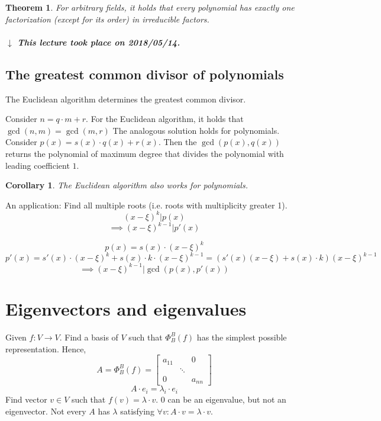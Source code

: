 \documentclass{article}
\newcounter{lecref}[section]
\numberwithin{lecref}{section}
\newtheorem{theorem}[lecref]{Theorem}
\newtheorem{corollary}[lecref]{Corollary}
\newcommand{\dateref}[1]{%
  \begin{mdframed}[backgroundcolor=gray!10,innerbottommargin=0pt,innertopmargin=0pt]
    \paragraph{\textit{$\downarrow$ This lecture took place on #1.}}%
  \end{mdframed}%
}
\begin{document}
\begin{theorem} %
  For arbitrary fields, it holds that
  every polynomial has exactly one factorization (except for its order) in irreducible factors.
\end{theorem}

\dateref{2018/05/14}

\subsection{The greatest common divisor of polynomials}

The Euclidean algorithm determines the greatest common divisor.

Consider $n = q \cdot m + r$. For the Euclidean algorithm, it holds that $\operatorname{gcd}(n, m) = \operatorname{gcd}(m, r)$
The analogous solution holds for polynomials. Consider $p(x) = s(x) \cdot q(x) + r(x)$.
Then the $\operatorname{gcd}(p(x), q(x))$ returns the polynomial of maximum degree that divides the polynomial with leading coefficient $1$.

\begin{corollary}
  The Euclidean algorithm also works for polynomials.
\end{corollary}

An application: Find all multiple roots (i.e. roots with multiplicity greater 1).
\[ (x - \xi)^k | p(x) \]
\[ \implies (x - \xi)^{k-1} | p'(x) \]

\[ p(x) = s(x) \cdot (x - \xi)^k \]
\[ p'(x) = s'(x) \cdot (x - \xi)^k + s(x) \cdot k \cdot (x - \xi)^{k-1} = (s'(x) (x - \xi) + s(x) \cdot k) (x - \xi)^{k-1} \]
\[ \implies (x - \xi)^{k-1} | \operatorname{gcd}(p(x), p'(x)) \]

\section{Eigenvectors and eigenvalues} %

Given $f: V \to V$. Find a basis of $V$ such that $\Phi_B^B(f)$ has the simplest possible representation.
Hence,
\[ A = \Phi_B^B(f) = \begin{bmatrix} a_{11} &  & 0 \\ & \ddots & \\ 0 &  & a_{nn} \end{bmatrix} \]
\[ A \cdot e_i = \lambda_i \cdot e_i \]
Find vector $v \in V$ such that $f(v) = \lambda \cdot v$.
$0$ can be an eigenvalue, but not an eigenvector. Not every $A$ has $\lambda$ satisfying $\forall v: A \cdot v = \lambda \cdot v$.
\end{document}
